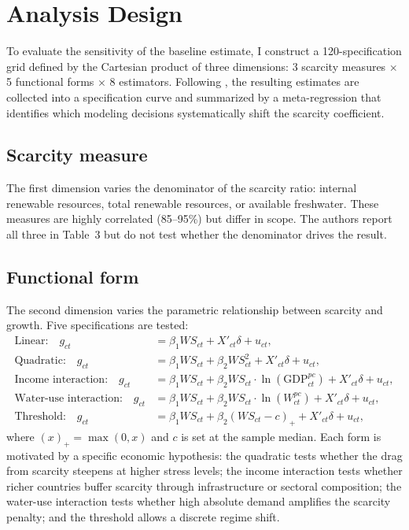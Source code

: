 \documentclass[12pt]{article}
\begin{document}
\section{Analysis Design}

To evaluate the sensitivity of the baseline estimate, I construct a 120-specification grid defined by the Cartesian product of three dimensions: 3 scarcity measures $\times$ 5 functional forms $\times$ 8 estimators. Following \citet{banzhaf_smith_2007}, the resulting estimates are collected into a specification curve and summarized by a meta-regression that identifies which modeling decisions systematically shift the scarcity coefficient.

\subsection*{Scarcity measure}

The first dimension varies the denominator of the scarcity ratio: internal renewable resources, total renewable resources, or available freshwater. These measures are highly correlated (85--95\%) but differ in scope. The authors report all three in Table~3 but do not test whether the denominator drives the result.

\subsection*{Functional form}

The second dimension varies the parametric relationship between scarcity and growth. Five specifications are tested:
\begin{align}
\text{Linear:} \quad g_{ct} &= \beta_1 WS_{ct} + X'_{ct}\delta + u_{ct}, \label{eq:linear} \\
\text{Quadratic:} \quad g_{ct} &= \beta_1 WS_{ct} + \beta_2 WS_{ct}^2 + X'_{ct}\delta + u_{ct}, \label{eq:quad} \\
\text{Income interaction:} \quad g_{ct} &= \beta_1 WS_{ct} + \beta_2 WS_{ct} \cdot \ln(\text{GDP}^{pc}_{ct}) + X'_{ct}\delta + u_{ct}, \label{eq:inc} \\
\text{Water-use interaction:} \quad g_{ct} &= \beta_1 WS_{ct} + \beta_2 WS_{ct} \cdot \ln(W^{pc}_{ct}) + X'_{ct}\delta + u_{ct}, \label{eq:use} \\
\text{Threshold:} \quad g_{ct} &= \beta_1 WS_{ct} + \beta_2 (WS_{ct} - c)_+ + X'_{ct}\delta + u_{ct}, \label{eq:thr}
\end{align}
where $(x)_+ = \max(0, x)$ and $c$ is set at the sample median. Each form is motivated by a specific economic hypothesis: the quadratic tests whether the drag from scarcity steepens at higher stress levels; the income interaction tests whether richer countries buffer scarcity through infrastructure or sectoral composition; the water-use interaction tests whether high absolute demand amplifies the scarcity penalty; and the threshold allows a discrete regime shift.
\end{document}
